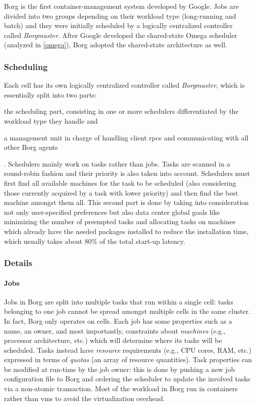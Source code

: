 Borg \cite{borg} is the first container-management system developed by Google.
Jobs are divided into two groups depending on their workload type (long-running and batch) and they were initially scheduled by a logically centralized controller called \textit{Borgmaster}.
After Google developed the shared-state Omega \cite{omega} scheduler (analyzed in \autoref{omega}), Borg \cite{borg} adopted the shared-state architecture as well.

\subsubsection{Scheduling}
Each cell has its own logically centralized controller called \textit{Borgmaster}, which is essentially split into two parts:
\begin{mylist}
    \item the scheduling part, consisting in one or more schedulers differentiated by the workload type they handle and
    \item a management unit in charge of handling client \glspl{rpc} and communicating with all other Borg \cite{borg} agents
\end{mylist}.
Schedulers mainly work on tasks rather than jobs.
Tasks are scanned in a round-robin fashion and their priority is also taken into account.
Schedulers must first find all available machines for the task to be scheduled (also considering those currently acquired by a task with lower priority) and then find the best machine amongst them all.
This second part is done by taking into consideration not only user-specified preferences but also data center global goals like minimizing the number of preempted tasks and allocating tasks on machines which already have the needed packages installed to reduce the installation time, which usually takes about 80\% of the total start-up latency.

\subsubsection{Details}

\paragraph{Jobs}
Jobs in Borg \cite{borg} are split into multiple tasks that run within a single cell: tasks belonging to one job cannot be spread amongst multiple cells in the same cluster.
In fact, Borg \cite{borg} only operates on cells.
Each job has some properties such as a name, an owner, and most importantly, constraints about \textit{machines} (e.g., processor architecture, etc.) which will determine where its tasks will be scheduled.
Tasks instead have \textit{resource} requirements (e.g., CPU cores, RAM, etc.) expressed in terms of \textit{quotas} (an array of resource quantities).
Task properties can be modified at run-time by the job owner: this is done by pushing a new job configuration file to Borg \cite{borg} and ordering the scheduler to update the involved tasks via a non-atomic transaction.
Most of the workload in Borg \cite{borg} run in containers rather than \glspl{vm} to avoid the virtualization overhead.

